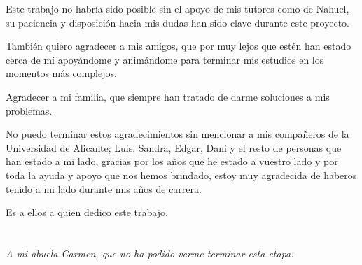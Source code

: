 Este trabajo no habría sido posible sin el apoyo de mis tutores como de Nahuel, su paciencia y disposición hacia mis dudas han sido clave durante este proyecto.

También quiero agradecer a mis amigos, que por muy lejos que estén han estado cerca de mí apoyándome y animándome para terminar mis estudios en los momentos más complejos.

Agradecer a mi familia, que siempre han tratado de darme soluciones a mis problemas.

No puedo terminar estos agradecimientos sin mencionar a mis compañeros de la Universidad de Alicante; Luis, Sandra, Edgar, Dani y el resto de personas que han estado a mi lado, gracias por los años que he estado a vuestro lado y por toda la ayuda y apoyo que nos hemos brindado, estoy muy agradecida de haberos tenido a mi lado durante mis años de carrera.

Es a ellos a quien dedico este trabajo.


\cleardoublepage %
\chapter*{}
\setlength{\leftmargin}{0.5\textwidth}
\setlength{\parsep}{0cm}
\addtolength{\topsep}{0.5cm}
\begin{flushright}
\small\em{
A mi abuela Carmen, que no ha podido verme terminar esta etapa.\\
}
\end{flushright}

\cleardoublepage %
